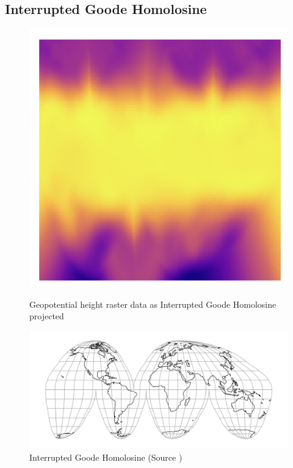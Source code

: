 \subsection{Interrupted Goode Homolosine}
\begin{figure}[H]
    \centering
    \begin{minipage}{0.30\textwidth}
        \centering
        \includegraphics[width=0.9\linewidth]{figures/chapter-8/geopoth_goode.png}
        \caption{ Geopotential height raster data as Interrupted Goode Homolosine projected}
        \label{fig:ig_geopoth_raster}
    \end{minipage}\hfill
    \begin{minipage}{0.30\textwidth}
        \centering
        \includegraphics[width=0.9\linewidth]{figures/chapter-8/igh.png}
        \caption{Interrupted Goode Homolosine (Source \cite{PROJ_SITE})}
        \label{fig:ig_proj}
    \end{minipage}\hfill

\end{figure}
